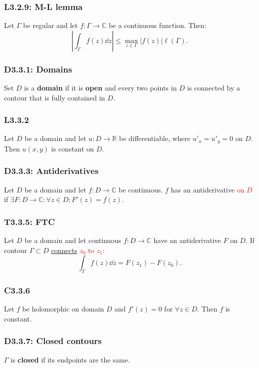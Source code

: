 \documentclass{article}
\begin{document}
\begin{multicols*}{3}
\subsubsection*{L3.2.9: M-L lemma}
Let $\Gamma$ be regular and let $f:\Gamma\rightarrow\mathbb{C}$
be a continuous function. Then:
$$\left|\int_{\Gamma}f(z)\dd z
\right|\leq\max_{z\in\Gamma}|f(z)|\ell(\Gamma).$$

\subsubsection*{D3.3.1: Domains}
Set $D$ is a \textbf{domain} if it is \textbf{open} and
every two points in $D$ is connected by a contour that
is fully contained in $D$.

\subsubsection*{L3.3.2}
Let $D$ be a domain and let $u:D\rightarrow\mathbb{R}$
be differentiable, where $u'_x=u'_y=0$ on $D$. Then $u(x,y)$
is constant on $D$.

\subsubsection*{D3.3.3: Antiderivatives}
Let $D$ be a domain and let $f:D\rightarrow\mathbb{C}$ be
continuous. $f$ has an antiderivative \textcolor{red}{on $D$} if
$\exists F:D\rightarrow\mathbb{C}:\forall z\in D; F'(z)=f(z)$.

\subsubsection*{T3.3.5: FTC}
Let $D$ be a domain and let continuous $f:D\rightarrow\mathbb{C}$
have an antiderivative $F$ on $D$. If contour $\Gamma\subset D$
\underline{connects} \textcolor{red}{$z_0$ to $z_1$}:
$$\int_{\Gamma}f(z)\dd z=F(z_1)-F(z_0).$$

\subsubsection*{C3.3.6}
Let $f$ be holomorphic on domain $D$ and
$f'(z)=0$ for $\forall z\in D$. Then $f$ is constant.

\subsubsection*{D3.3.7: Closed contours}
$\Gamma$ is \textbf{closed} if its endpoints are the same.


\end{multicols*}
\end{document}
